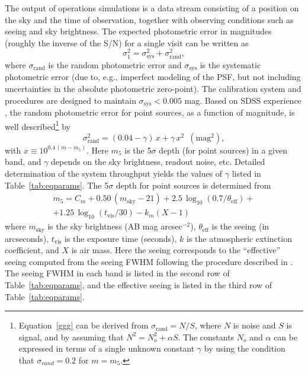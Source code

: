 The output of operations simulations is a data stream consisting of
a position on the sky and the time of observation, together with
observing conditions such as seeing and sky brightness. The expected
photometric error in magnitudes (roughly the inverse of the
S/N) for a single visit can be written as
\begin{equation}
         \sigma_1^2 = \sigma_\mathrm{sys}^2 + \sigma_\mathrm{rand}^2,
\end{equation}
where $\sigma_\mathrm{rand}$ is the random photometric error and $\sigma_\mathrm{sys}$ is
the systematic photometric error (due to, e.g., imperfect
modeling of the PSF, but not including uncertainties
in the
absolute photometric zero-point). The calibration system and procedures
are designed to maintain $\sigma_\mathrm{sys}<0.005$ mag. Based on
SDSS experience \citep{2007AJ....134.2236S}, the random photometric error for
point sources, as
a function of magnitude, is well described\footnote{Equation~\ref{ggg} can
be derived from $\sigma_\mathrm{rand}=N/S$, where $N$ is noise and $S$ is signal,
and by assuming that $N^2 = N_o^2 + \alpha S$. The constants $N_o$ and
$\alpha$ can be expressed in terms of a single unknown constant $\gamma$
by using the condition that $\sigma_{rand}=0.2$ for $m=m_5$.} by
\begin{equation}
\label{ggg}
  \sigma_\mathrm{rand}^2 = (0.04-\gamma)\, x + \gamma \, x^2 \,\,\, \mathrm{(mag^2),}
\end{equation}
with $x \equiv 10^{0.4\,(m-m_5)}$. Here $m_5$ is the 5$\sigma$ depth (for
point sources) in a given band, and $\gamma$ depends on the sky
brightness, readout noise, etc.
Detailed determination of the system throughput yields the values of $\gamma$
listed in Table~\ref{tab:eqparams}. The 5$\sigma$ depth for point sources is determined from
\begin{eqnarray}
\label{m5}
  m_5 = C_m + 0.50\,(m_\mathrm{sky}-21) + 2.5\,\log_{10}(0.7/\theta_\mathrm{eff}) +  \nonumber \\
        + 1.25\,\log_{10}(t_\mathrm{vis}/30) - k_m(X-1) \phantom{xxxxx}
\end{eqnarray}
where $m_\mathrm{sky}$ is the sky brightness (AB mag arcsec$^{-2}$), $\theta_\mathrm{eff}$ is
the seeing (in arcseconds), $t_\mathrm{vis}$ is the exposure time (seconds),
$k$ is the atmospheric extinction coefficient, and $X$ is air mass. Here
the seeing corresponds to the ``effective'' seeing computed from
the seeing FWHM following the procedure described in \cite{2016SPIE.9911E..18A}.
The seeing FWHM in each band is listed in
the second row of Table~\ref{tab:eqparams}, and the effective seeing is listed in the
third row of Table~\ref{tab:eqparams}.

